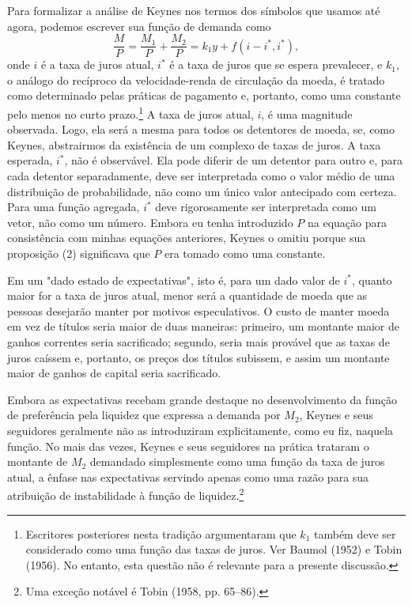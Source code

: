 \documentclass[12pt]{article}
\begin{document}
Para formalizar a análise de Keynes nos termos dos símbolos que usamos até agora, podemos escrever sua função de demanda como
\begin{equation}
\frac{M}{P} = \frac{M_1}{P} + \frac{M_2}{P} = k_1 y + f(i - i^*, i^*),
\end{equation}
onde $i$ é a taxa de juros atual, $i^*$ é a taxa de juros que se espera prevalecer, e $k_1$, o análogo do recíproco da velocidade-renda de circulação da moeda, é tratado como determinado pelas práticas de pagamento e, portanto, como uma constante pelo menos no curto prazo.\footnote{Escritores posteriores nesta tradição argumentaram que $k_1$ também deve ser considerado como uma função das taxas de juros. Ver Baumol (1952) e Tobin (1956). No entanto, esta questão não é relevante para a presente discussão.} A taxa de juros atual, $i$, é uma magnitude observada. Logo, ela será a mesma para todos os detentores de moeda, se, como Keynes, abstrairmos da existência de um complexo de taxas de juros. A taxa esperada, $i^*$, não é observável. Ela pode diferir de um detentor para outro e, para cada detentor separadamente, deve ser interpretada como o valor médio de uma distribuição de probabilidade, não como um único valor antecipado com certeza. Para uma função agregada, $i^*$ deve rigorosamente ser interpretada como um vetor, não como um número. Embora eu tenha introduzido $P$ na equação para consistência com minhas equações anteriores, Keynes o omitiu porque sua proposição (2) significava que $P$ era tomado como uma constante.

Em um "dado estado de expectativas", isto é, para um dado valor de $i^*$, quanto maior for a taxa de juros atual, menor será a quantidade de moeda que as pessoas desejarão manter por motivos especulativos. O custo de manter moeda em vez de títulos seria maior de duas maneiras: primeiro, um montante maior de ganhos correntes seria sacrificado; segundo, seria mais provável que as taxas de juros caíssem e, portanto, os preços dos títulos subissem, e assim um montante maior de ganhos de capital seria sacrificado.

Embora as expectativas recebam grande destaque no desenvolvimento da função de preferência pela liquidez que expressa a demanda por $M_2$, Keynes e seus seguidores geralmente não as introduziram explicitamente, como eu fiz, naquela função. No mais das vezes, Keynes e seus seguidores na prática trataram o montante de $M_2$ demandado simplesmente como uma função da taxa de juros atual, a ênfase nas expectativas servindo apenas como uma razão para sua atribuição de instabilidade à função de liquidez.\footnote{Uma exceção notável é Tobin (1958, pp. 65–86).}
\end{document}
